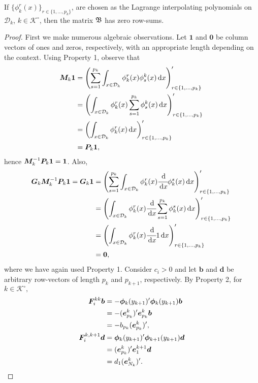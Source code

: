 \begin{lem}
	If \(\{\phi^r_k(x)\}_{r\in\{1,...,p_k\}}\), are chosen as the Lagrange interpolating polynomials on \(\mathcal D_k\), \(k\in\mathcal K^\circ\), then the matrix \( {  {\mathfrak{\boldsymbol B}}}\) has zero row-sums. 
\end{lem}
\begin{proof}
	First we make numerous algebraic observations. Let \(\boldsymbol 1\) and \(\boldsymbol 0\) be column vectors of ones and zeros, respectively, with an appropriate length depending on the context. Using Property 1, observe that 
	\begin{align*}
        \boldsymbol M_k\boldsymbol 1 &= \left(\sum_{s=1}^{p_k} \int_{x\in\mathcal{D}_k}\phi^r_k(x)\phi_s^k(x)\, \mathrm{d} x\right)_{r\in\{1,...,p_k\}}'{}
        \\&= \left(\int_{x\in\mathcal{D}_k}\phi^r_k(x)\sum_{s=1}^{p_k} \phi_s^k(x)\, \mathrm{d} x \right)_{r\in\{1,...,p_k\}} '{}
        \\&= \left(\int_{x\in\mathcal{D}_k}\phi^r_k(x)\, \mathrm{d} x\right)_{r\in\{1,...,p_k\}} '{}
        \\&= \boldsymbol P_k\boldsymbol 1,
	\end{align*}
	hence \(\boldsymbol M_k^{-1}\boldsymbol P_k\boldsymbol 1=\boldsymbol 1\). Also, 
	\begin{align*}
        \boldsymbol G_k\boldsymbol M_k^{-1}\boldsymbol P_k\boldsymbol 1 = \boldsymbol G_k\boldsymbol 1 &= \left(\sum_{s=1}^{p_k} \int_{x\in\mathcal{D}_k}\phi^r_k(x)\cfrac{\, \mathrm{d} }{\, \mathrm{d} x}\phi_k^s(x)\, \mathrm{d} x\right)_{r\in\{1,...,p_k\}} '{}
        \\&= \left(\int_{x\in\mathcal{D}_k}\phi^r_k(x)\cfrac{\, \mathrm{d} }{\, \mathrm{d} x}\sum_{s=1}^{p_k} \phi_k^s(x)\, \mathrm{d} x \right)_{r\in\{1,...,p_k\}} '{}
        \\&= \left(\int_{x\in\mathcal{D}_k}\phi^r_k(x)\cfrac{\, \mathrm{d} }{\, \mathrm{d} x}1\, \mathrm{d} x\right)_{r\in\{1,...,p_k\}} '{}
        \\&= \boldsymbol 0,
	\end{align*}
	where we have again used Property 1. Consider \(c_i>0\) and let \(\boldsymbol b\) and \(\boldsymbol d\) be arbitrary row-vectors of length \(p_k\) and \(p_{k+1}\), respectively. By Property 2, for \(k\in\mathcal K^\circ,\)
	\begin{align*}
        \bs F_i^{kk}\boldsymbol b &= -\boldsymbol \phi_k(y_{k+1})\tr{} \boldsymbol \phi_k(y_{k+1})\boldsymbol b \\&= -(\bs e^k_{p_k})\tr{} \bs e_{p_k}^k\bs b \\&= -b_{p_k}(\boldsymbol e_{p_k}^k)\tr{},
        \\\bs F_i^{k,k+1}\boldsymbol d &= \boldsymbol \phi_{k}(y_{k+1})\tr{} \boldsymbol \phi_{k+1}(y_{k+1})\boldsymbol d \\&= (\bs e^{k}_{p_k})\tr{} \bs e_{1}^{k+1}\bs d \\&= d_{1}(\boldsymbol e_{N_{k}}^{k})\tr{}.

\end{align*}
\end{proof}
